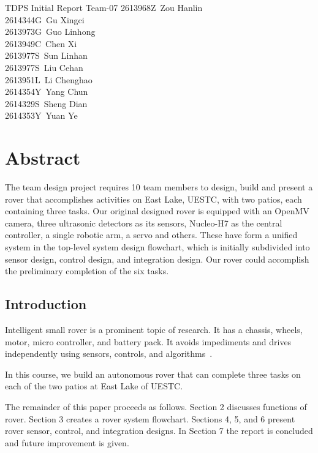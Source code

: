 \documentclass{solutionclass} %
\begin{document}
\pretitle
{TDPS Initial Report}               %
{Team-07}        %
{
2613968Z\ Zou Hanlin\\
2614344G\ Gu Xingci\\
2613973G\ Guo Linhong\\
2613949C\ Chen Xi\\
2613977S\ Sun Linhan\\
2613977S\ Liu Cehan\\
2613951L\ Li Chenghao\\
2614354Y\ Yang Chun\\
2614329S\ Sheng Dian\\
2614353Y\ Yuan Ye
}                 %

\makeatletter
    \startcontents[sections]
    \chapter{Abstract}
\makeatother
The team design project requires 10 team members to design, build and present a rover that accomplishes activities on East Lake, UESTC, with two patios, each containing three tasks. Our original designed rover is equipped with an OpenMV camera, three ultrasonic detectors as its sensors, Nucleo-H7 as the central controller, a single robotic arm, a servo and others. These have form a unified system in the top-level system design flowchart, which is initially subdivided into sensor design, control design, and integration design. Our rover could accomplish the preliminary completion of the six tasks.

\setcounter{section}{1}
\section{Introduction}
Intelligent small rover is a prominent topic of research. It has a chassis, wheels, motor, micro controller, and battery pack. It avoids impediments and drives independently using sensors, controls, and algorithms~\cite{92}.

In this course, we build an autonomous rover that can complete three tasks on each of the two patios at East Lake of UESTC.

The remainder of this paper proceeds as follows. Section 2 discusses functions of rover. Section 3 creates a rover system flowchart. Sections 4, 5, and 6 present rover sensor, control, and integration designs. In Section 7 the report is concluded and future improvement is given.
\end{document}
